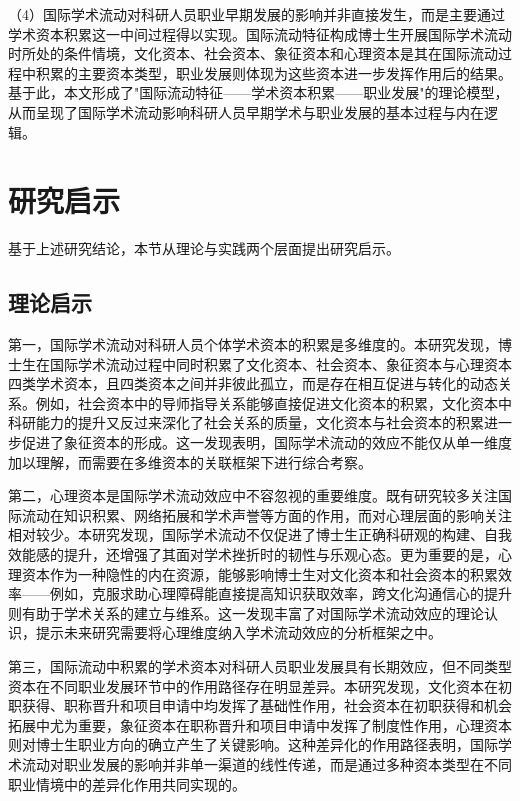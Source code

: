 （4）国际学术流动对科研人员职业早期发展的影响并非直接发生，而是主要通过学术资本积累这一中间过程得以实现。国际流动特征构成博士生开展国际学术流动时所处的条件情境，文化资本、社会资本、象征资本和心理资本是其在国际流动过程中积累的主要资本类型，职业发展则体现为这些资本进一步发挥作用后的结果。基于此，本文形成了"国际流动特征——学术资本积累——职业发展"的理论模型，从而呈现了国际学术流动影响科研人员早期学术与职业发展的基本过程与内在逻辑。

\section{研究启示}

基于上述研究结论，本节从理论与实践两个层面提出研究启示。

\subsection{理论启示}

第一，国际学术流动对科研人员个体学术资本的积累是多维度的。本研究发现，博士生在国际学术流动过程中同时积累了文化资本、社会资本、象征资本与心理资本四类学术资本，且四类资本之间并非彼此孤立，而是存在相互促进与转化的动态关系。例如，社会资本中的导师指导关系能够直接促进文化资本的积累，文化资本中科研能力的提升又反过来深化了社会关系的质量，文化资本与社会资本的积累进一步促进了象征资本的形成。这一发现表明，国际学术流动的效应不能仅从单一维度加以理解，而需要在多维资本的关联框架下进行综合考察。

第二，心理资本是国际学术流动效应中不容忽视的重要维度。既有研究较多关注国际流动在知识积累、网络拓展和学术声誉等方面的作用，而对心理层面的影响关注相对较少。本研究发现，国际学术流动不仅促进了博士生正确科研观的构建、自我效能感的提升，还增强了其面对学术挫折时的韧性与乐观心态。更为重要的是，心理资本作为一种隐性的内在资源，能够影响博士生对文化资本和社会资本的积累效率——例如，克服求助心理障碍能直接提高知识获取效率，跨文化沟通信心的提升则有助于学术关系的建立与维系。这一发现丰富了对国际学术流动效应的理论认识，提示未来研究需要将心理维度纳入学术流动效应的分析框架之中。

第三，国际流动中积累的学术资本对科研人员职业发展具有长期效应，但不同类型资本在不同职业发展环节中的作用路径存在明显差异。本研究发现，文化资本在初职获得、职称晋升和项目申请中均发挥了基础性作用，社会资本在初职获得和机会拓展中尤为重要，象征资本在职称晋升和项目申请中发挥了制度性作用，心理资本则对博士生职业方向的确立产生了关键影响。这种差异化的作用路径表明，国际学术流动对职业发展的影响并非单一渠道的线性传递，而是通过多种资本类型在不同职业情境中的差异化作用共同实现的。

